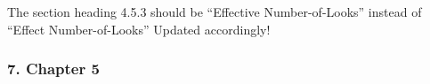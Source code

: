 \replyToComment
    {The section heading 4.5.3 should be ``Effective Number-of-Looks'' instead of ``Effect Number-of-Looks''}
    {Updated accordingly!}

%
%
%
%
%

\subsubsection*{7. Chapter 5}

